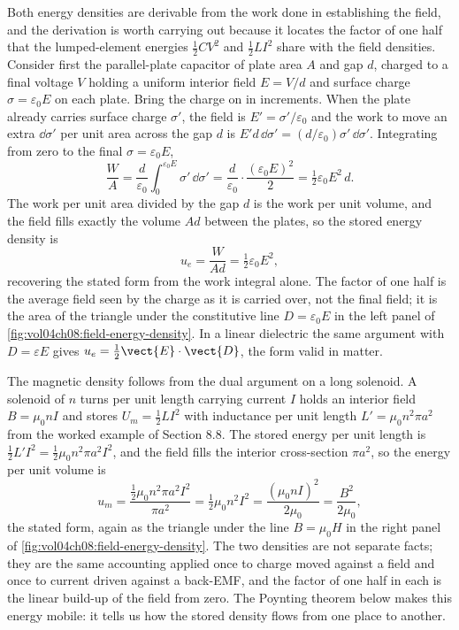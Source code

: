 Both energy densities are derivable from the work done in establishing
the field, and the derivation is worth carrying out because it locates
the factor of one half that the lumped-element energies
$\tfrac12 CV^{2}$ and $\tfrac12 LI^{2}$ share with the field densities.
Consider first the parallel-plate capacitor of plate area $A$ and gap
$d$, charged to a final voltage $V$ holding a uniform interior field
$E = V/d$ and surface charge $\sigma = \varepsilon_{0} E$ on each plate.
Bring the charge on in increments. When the plate already carries
surface charge $\sigma'$, the field is $E' = \sigma'/\varepsilon_{0}$
and the work to move an extra $\dd\sigma'$ per unit area across the gap
$d$ is $E' d\,\dd\sigma' = (d/\varepsilon_{0})\sigma'\,\dd\sigma'$.
Integrating from zero to the final $\sigma = \varepsilon_{0} E$,
\[
\frac{W}{A} = \frac{d}{\varepsilon_{0}}\int_{0}^{\varepsilon_{0}E}
\sigma'\,\dd\sigma' = \frac{d}{\varepsilon_{0}}\cdot
\frac{(\varepsilon_{0}E)^{2}}{2} = \tfrac{1}{2}\varepsilon_{0}E^{2}\,d.
\]
The work per unit area divided by the gap $d$ is the work per unit
volume, and the field fills exactly the volume $Ad$ between the plates,
so the stored energy density is
\[
u_{e} = \frac{W}{Ad} = \tfrac{1}{2}\varepsilon_{0}E^{2},
\]
recovering the stated form from the work integral alone. The factor of
one half is the average field seen by the charge as it is carried over,
not the final field; it is the area of the triangle under the
constitutive line $D = \varepsilon_{0}E$ in the left panel of
\cref{fig:vol04ch08:field-energy-density}. In a linear dielectric the
same argument with $D = \varepsilon E$ gives $u_{e} = \tfrac12 \vect{E}
\cdot\vect{D}$, the form valid in matter.

The magnetic density follows from the dual argument on a long solenoid.
A solenoid of $n$ turns per unit length carrying current $I$ holds an
interior field $B = \mu_{0} n I$ and stores $U_{m} = \tfrac12 L I^{2}$
with inductance per unit length $L' = \mu_{0} n^{2}\pi a^{2}$ from the
worked example of Section 8.8. The stored energy per unit length is
$\tfrac12 L' I^{2} = \tfrac12\mu_{0} n^{2}\pi a^{2} I^{2}$, and the
field fills the interior cross-section $\pi a^{2}$, so the energy per
unit volume is
\[
u_{m} = \frac{\tfrac12\mu_{0} n^{2}\pi a^{2} I^{2}}{\pi a^{2}} =
\tfrac{1}{2}\mu_{0} n^{2} I^{2} = \frac{(\mu_{0} n I)^{2}}{2\mu_{0}} =
\frac{B^{2}}{2\mu_{0}},
\]
the stated form, again as the triangle under the line $B = \mu_{0} H$ in
the right panel of \cref{fig:vol04ch08:field-energy-density}. The two
densities are not separate facts; they are the same accounting applied
once to charge moved against a field and once to current driven against
a back-EMF, and the factor of one half in each is the linear build-up of
the field from zero. The Poynting theorem below makes this energy
mobile: it tells us how the stored density flows from one place to
another.

